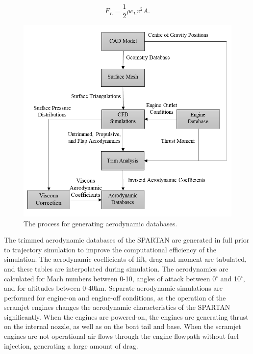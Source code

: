 \begin{equation}
F_L = \frac{1}{2}\rho c_L v^2 A .
\end{equation}


\begin{figure}[ht]
	\centering
	\includegraphics[width=0.7\linewidth]{figures/3_vehicle_design/FlowChart}
	\caption{The process for generating aerodynamic databases.}
	\label{fig:FlowChart}
\end{figure}

The trimmed aerodynamic databases of the SPARTAN are generated in full prior to trajectory simulation to improve the computational efficiency of the simulation. The aerodynamic coefficients of lift, drag and moment are tabulated, and these tables are interpolated during simulation. 
The aerodynamics are calculated for Mach numbers between 0-10, angles of attack between 0$^\circ$ and 10$^\circ$, and for altitudes between 0-40km. Separate aerodynamic simulations are performed for engine-on and engine-off conditions, as the operation of the scramjet engines changes the aerodynamic characteristics of the SPARTAN significantly. When the engines are powered-on, the engines are generating thrust on the internal nozzle, as well as on the boat tail and base.  When the scramjet engines are not operational air flows through the engine flowpath without fuel injection, generating a large amount of drag. 


